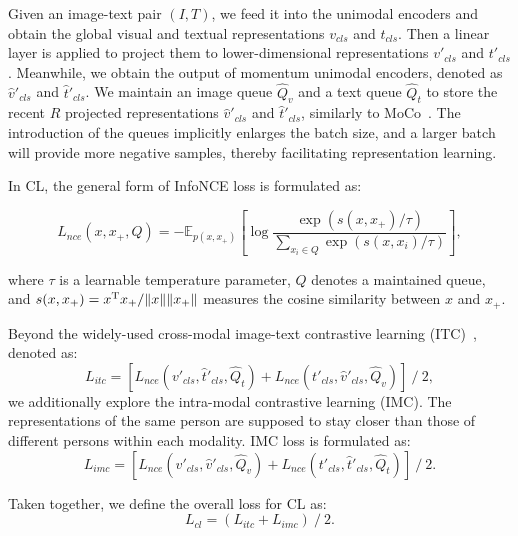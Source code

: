 \documentclass{article}
\begin{document}
Given an image-text pair $(I, T)$, we feed it into the unimodal encoders and obtain the global visual and textual representations $v_{cls}$ and $t_{cls}$.
Then a linear layer is applied to project them to lower-dimensional representations $v'_{cls}$ and $t'_{cls}$.
Meanwhile, we obtain the output of momentum unimodal encoders, denoted as $\hat{v}'_{cls}$ and $\hat{t}'_{cls}$.
We maintain an image queue $\hat{Q}_v$ and a text queue $\hat{Q}_t$ to store the recent $R$ projected representations $\hat{v}'_{cls}$ and $\hat{t}'_{cls}$, similarly to MoCo~\cite{he2020momentum}. 
The introduction of the queues implicitly enlarges the batch size, and a larger batch will provide more negative samples, thereby facilitating representation learning.

In CL, the general form of InfoNCE loss is formulated as:
\begin{small}
\begin{equation}
    L_{nce}(x, x_+, Q) = -\mathbb{E}_{p(x, x_+)} [\log\frac{\exp(s(x, x_+)/\tau)}{\sum\limits_{x_i \in Q}\exp(s(x, x_i)/\tau)}], \label{equ7}
\end{equation}
\end{small}
where $\tau$ is a learnable temperature parameter, $Q$ denotes a maintained queue, and $s(x, x_+)=x^{\rm T}x_+/\lVert x\rVert\lVert x_+\rVert$ measures the cosine similarity between $x$ and $x_+$. 

Beyond the widely-used cross-modal image-text contrastive learning (ITC)~\cite{NEURIPS2021_50525975,radford2021learning}, denoted as:
\begin{equation}
    L_{itc} = [L_{nce}(v'_{cls}, \hat{t}'_{cls}, \hat{Q}_t) + L_{nce}(t'_{cls}, \hat{v}'_{cls}, \hat{Q}_v)]\ /\ 2, \label{equ8}
\end{equation}
we additionally explore the intra-modal contrastive learning (IMC).
The representations of the same person are supposed to stay closer than those of different persons within each modality. IMC loss is formulated as:
\begin{equation}
    L_{imc} = [L_{nce}(v'_{cls}, \hat{v}'_{cls}, \hat{Q}_v) + L_{nce}(t'_{cls}, \hat{t}'_{cls}, \hat{Q}_t)]\ /\ 2. \label{equ9}
\end{equation}

Taken together, we define the overall loss for CL as:
\begin{equation}
    L_{cl} = (L_{itc} + L_{imc})\ /\ 2. \label{equ10}
\end{equation}
\end{document}
